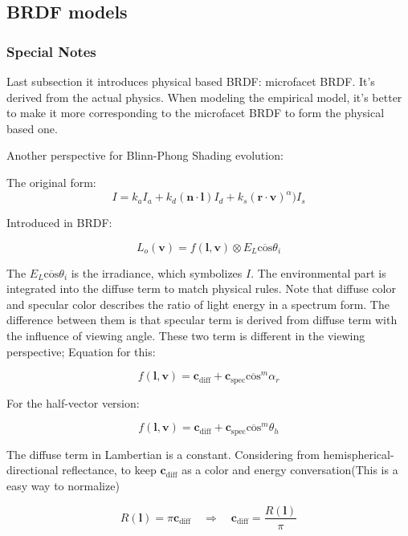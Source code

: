 \documentclass[10pt, a4paper]{article}
\begin{document}
    \subsection{BRDF models}

        \subsubsection{Special Notes}
            Last subsection it introduces physical based BRDF: microfacet BRDF. It's derived from the actual physics. When modeling the empirical model, it's better to make it more corresponding to the microfacet BRDF to form the physical based one. 
            
            Another perspective for Blinn-Phong Shading evolution: 

            The original form: 
            $$I = k_aI_a + k_d(\textbf{n}\cdot \textbf{l})I_d + k_s(\textbf{r} \cdot \textbf{v})^{\alpha})I_s$$
            
            Introduced in BRDF: 

            $$L_o(\textbf{v}) = f(\textbf{l}, \textbf{v}) \otimes E_L\overline{\text{cos}}\theta_{i}$$

            The $E_L\overline{\text{cos}}\theta_i$ is the irradiance, which symbolizes $I$. The environmental part is integrated into the diffuse term to match physical rules. Note that diffuse color and specular color describes the ratio of light energy in a spectrum form. The difference between them is that specular term is derived from diffuse term with the influence of viewing angle. These two term is different in the viewing perspective; Equation for this:

            $$f(\textbf{l}, \textbf{v}) = \textbf{c}_{\text{diff}} + \textbf{c}_{\text{spec}}\overline{\text{cos}}^m\alpha_r$$

            For the half-vector version: 

            $$f(\textbf{l}, \textbf{v}) = \textbf{c}_{\text{diff}} + \textbf{c}_{\text{spec}}\overline{\text{cos}}^m\theta_h$$            

            The diffuse term in Lambertian is a constant. Considering from hemispherical-directional reflectance, to keep $\textbf{c}_{\text{diff}}$ as a color and energy conversation(This is a easy way to normalize)

            $$R(\textbf{l}) =  \pi\textbf{c}_{\text{diff}} \quad\Rightarrow\quad \textbf{c}_{\text{diff}} = \frac{R(\textbf{l})}{\pi}$$
            
\end{document}
